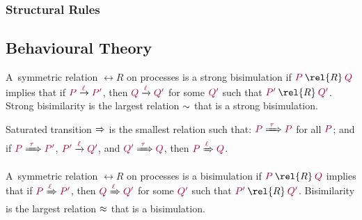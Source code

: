 \documentclass[main.tex]{subfiles}
\begin{document}
\subsubsection{Structural Rules}
\begin{mathpar}




\end{mathpar}

\subsection{Behavioural Theory}
\begin{definition}
  A~symmetric relation $\rel{R}$ on processes is a strong bisimulation if $\tm{P}\mathbin{\rel{R}}\tm{Q}$ implies that if $\tm{P}\lto{\ell}\tm{P'}$, then $\tm{Q}\lto{\ell}\tm{Q'}$ for some $\tm{Q'}$ such that $\tm{P'}\mathbin{\rel{R}}\tm{Q'}$. Strong bisimilarity is the largest relation $\sbis$ that is a strong bisimulation.
\end{definition}
\begin{definition}
  Saturated transition $\slto{}$ is the smallest relation such that: $\tm{P}\stto\tm{P}$ for all $\tm{P}$; and if $\tm{P}\stto\tm{P'}$, $\tm{P'}\lto{\ell}\tm{Q'}$, and $\tm{Q'}\stto\tm{Q}$, then $\tm{P}\slto{\ell}\tm{Q}$.
\end{definition}
\begin{definition}[Bisimilarity]
  A~symmetric relation $\rel{R}$ on processes is a bisimulation if $\tm{P}\mathbin{\rel{R}}\tm{Q}$ implies that if $\tm{P}\slto{\ell}\tm{P'}$, then $\tm{Q}\slto{\ell}\tm{Q'}$ for some $\tm{Q'}$ such that $\tm{P'}\mathbin{\rel{R}}\tm{Q'}$. Bisimilarity is the largest relation $\bis$ that is a bisimulation.
\end{definition}
\end{document}
